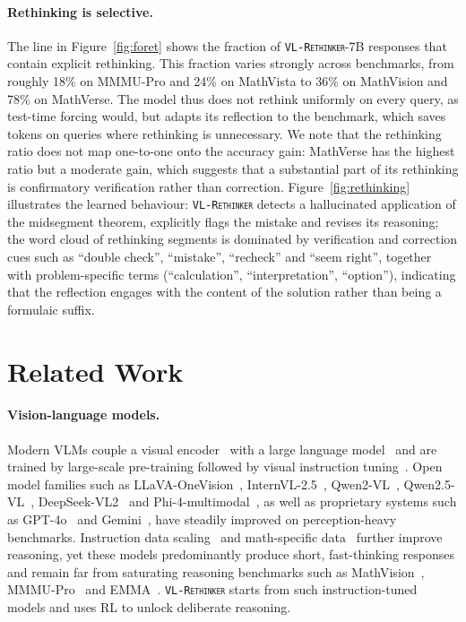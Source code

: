 \documentclass{article}
\newcommand{\model}{\texttt{\textsc{VL-Rethinker}}\xspace}
\begin{document}
\paragraph{Rethinking is selective.} The line in Figure~\ref{fig:foret} shows the fraction of \model-7B responses that contain explicit rethinking. This fraction varies strongly across benchmarks, from roughly 18\% on MMMU-Pro and 24\% on MathVista to 36\% on MathVision and 78\% on MathVerse. The model thus does not rethink uniformly on every query, as test-time forcing would, but adapts its reflection to the benchmark, which saves tokens on queries where rethinking is unnecessary. We note that the rethinking ratio does not map one-to-one onto the accuracy gain: MathVerse has the highest ratio but a moderate gain, which suggests that a substantial part of its rethinking is confirmatory verification rather than correction. Figure~\ref{fig:rethinking} illustrates the learned behaviour: \model detects a hallucinated application of the midsegment theorem, explicitly flags the mistake and revises its reasoning; the word cloud of rethinking segments is dominated by verification and correction cues such as ``double check'', ``mistake'', ``recheck'' and ``seem right'', together with problem-specific terms (``calculation'', ``interpretation'', ``option''), indicating that the reflection engages with the content of the solution rather than being a formulaic suffix.

\section{Related Work}
\label{sec:related}

\paragraph{Vision-language models.} Modern VLMs couple a visual encoder~\citep{siglip} with a large language model~\citep{llama3,qwen2_5} and are trained by large-scale pre-training followed by visual instruction tuning~\citep{llava,liu2023visualinstructiontuning,instructblip,minigpt4,li2023blip2bootstrappinglanguageimagepretraining,mckinzie2024mm1methodsanalysis,tong2024cambrian1fullyopenvisioncentric,molmo}. Open model families such as LLaVA-OneVision~\citep{llavaov}, InternVL-2.5~\citep{internvl_2_5}, Qwen2-VL~\citep{qwen2vl}, Qwen2.5-VL~\citep{qwen2_5_vl}, DeepSeek-VL2~\citep{deepseekvl2} and Phi-4-multimodal~\citep{phi_4_mini}, as well as proprietary systems such as GPT-4o~\citep{gpt4o} and Gemini~\citep{gemini,gemini_1_5}, have steadily improved on perception-heavy benchmarks. Instruction data scaling~\citep{xu2024visionflanscalinghumanlabeledtasks,mammothvl,infinity-mm,visualwebinstruct} and math-specific data~\citep{gllava,shi2024mathllavabootstrappingmathematicalreasoning} further improve reasoning, yet these models predominantly produce short, fast-thinking responses and remain far from saturating reasoning benchmarks such as MathVision~\citep{mathvision}, MMMU-Pro~\citep{mmmupro} and EMMA~\citep{emma}. \model starts from such instruction-tuned models and uses RL to unlock deliberate reasoning.
\end{document}

